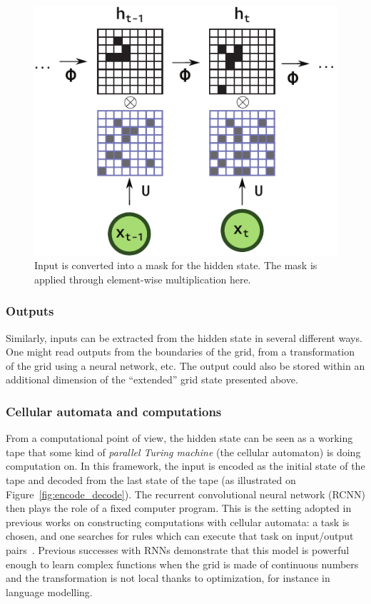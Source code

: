 \begin{description}
\begin{figure}[ht]
  \centering
  \includegraphics[width=.5\linewidth]{figures/mask.pdf}
  \caption{\label{fig:mask} Input is converted into a mask for the hidden state.
  The mask is applied through element-wise multiplication here.}
\end{figure}

\end{description}

\subsubsection{Outputs}

Similarly, inputs can be extracted from the hidden state in several different
ways. One might read outputs from the boundaries of the grid, from a
transformation of the grid using a neural network, etc. The output could also be
stored within an additional dimension of the ``extended'' grid state presented
above.

\subsubsection{Cellular automata and computations}

From a computational point of view, the hidden state can be seen as a working
tape that some kind of \emph{parallel Turing machine} (the cellular automaton)
is doing computation on. In this framework, the input is encoded as the initial
state of the tape and decoded from the last state of the tape (as illustrated on
Figure~\ref{fig:encode_decode}). The recurrent convolutional neural network
(RCNN) then plays the role of a fixed computer program. This is the setting
adopted in previous works on constructing computations with cellular automata: a
task is chosen, and one searches for rules which can execute that task on
input/output pairs~\parencite{mitchellComputationCellularAutomata2005}. Previous
successes with RNNs demonstrate that this model is powerful enough to learn
complex functions when the grid is made of continuous numbers and the
transformation is not local thanks to optimization, for instance in language
modelling.

